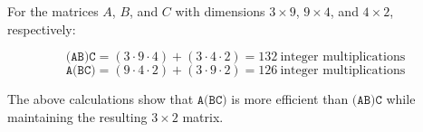 \documentclass[11pt]{article}
\begin{document}
For the matrices $A$, $B$, and $C$ with dimensions $3 \times 9$, $9 \times 4$, and $4 \times 2$, respectively:

\[\texttt{(AB)C} = (3 \cdot 9 \cdot 4) + (3 \cdot 4 \cdot 2) = 132 \ \text{integer multiplications}\]
\[\texttt{A(BC)} = (9 \cdot 4 \cdot 2) + (3 \cdot 9 \cdot 2) = 126 \ \text{integer multiplications}\]

The above calculations show that $\texttt{A(BC)}$ is more efficient than $\texttt{(AB)C}$ while maintaining the resulting $3 \times 2$ matrix.
\end{document}
